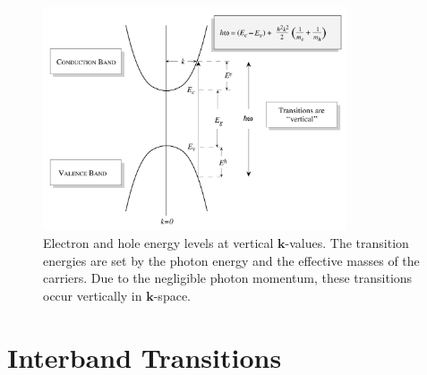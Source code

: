 \begin{figure}[H]
	\centering
	\includegraphics[width=0.8\textwidth]{img/transitions.png}
	\caption{Electron and hole energy levels at vertical \(\mathbf{k}\)-values. The transition energies are set by the photon energy and the effective masses of the carriers. Due to the negligible photon momentum, these transitions occur vertically in \(\mathbf{k}\)-space.
	}
	\label{fig:transitions}
\end{figure}



\section{Interband Transitions}
